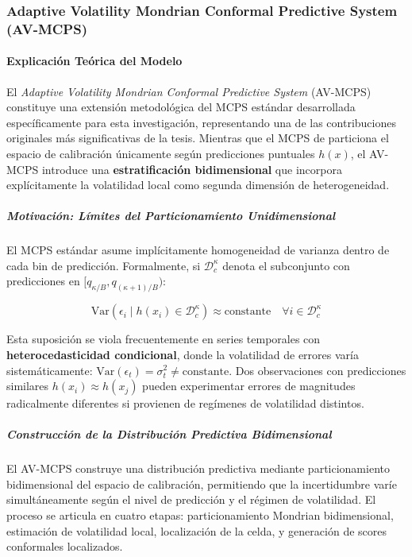 \subsubsection{Adaptive Volatility Mondrian Conformal Predictive System (AV-MCPS)}
\label{subsec:AV-MCPS}
\paragraph{Explicación Teórica del Modelo}

El \textit{Adaptive Volatility Mondrian Conformal Predictive System} (AV-MCPS) constituye una extensión metodológica del MCPS estándar desarrollada específicamente para esta investigación, representando una de las contribuciones originales más significativas de la tesis. Mientras que el MCPS de \textcite{Ye2025} particiona el espacio de calibración únicamente según predicciones puntuales $h(x)$, el AV-MCPS introduce una \textbf{estratificación bidimensional} que incorpora explícitamente la volatilidad local como segunda dimensión de heterogeneidad.

\subparagraph{Motivación: Límites del Particionamiento Unidimensional}

El MCPS estándar asume implícitamente homogeneidad de varianza dentro de cada bin de predicción. Formalmente, si $\mathcal{D}_c^{\kappa}$ denota el subconjunto con predicciones en $[q_{\kappa/B}, q_{(\kappa+1)/B})$:

\begin{equation}
\text{Var}(\epsilon_i \mid h(x_i) \in \mathcal{D}_c^{\kappa}) \approx \text{constante} \quad \forall i \in \mathcal{D}_c^{\kappa}
\end{equation}

Esta suposición se viola frecuentemente en series temporales con \textbf{heterocedasticidad condicional}, donde la volatilidad de errores varía sistemáticamente: $\text{Var}(\epsilon_t) = \sigma_t^2 \neq \text{constante}$. Dos observaciones con predicciones similares $h(x_i) \approx h(x_j)$ pueden experimentar errores de magnitudes radicalmente diferentes si provienen de regímenes de volatilidad distintos.

\subparagraph{Construcción de la Distribución Predictiva Bidimensional}

El AV-MCPS construye una distribución predictiva mediante particionamiento bidimensional del espacio de calibración, permitiendo que la incertidumbre varíe simultáneamente según el nivel de predicción y el régimen de volatilidad. El proceso se articula en cuatro etapas: particionamiento Mondrian bidimensional, estimación de volatilidad local, localización de la celda, y generación de scores conformales localizados.

